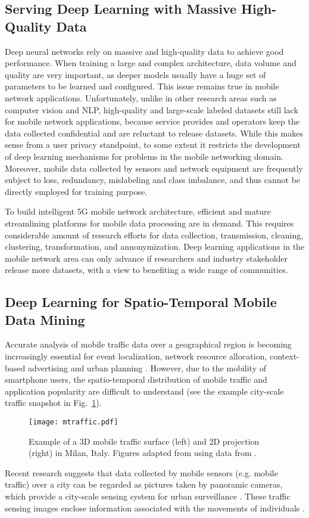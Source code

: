 \documentclass[journal,comsoc,letter]{IEEEtran}
\begin{document}
\subsection{Serving Deep Learning with Massive High-Quality Data}
Deep neural networks rely on massive and high-quality data to achieve good performance. When training a large and complex architecture, data volume and quality are very important, as deeper models usually have a huge set of parameters to be learned and configured. This issue remains true in mobile network applications. Unfortunately, unlike in other research areas such as computer vision and NLP, high-quality and large-scale labeled datasets still lack for mobile network applications, because service provides and operators keep the data collected confidential and are reluctant to release datasets. While this makes sense from a user privacy standpoint, to some extent it restricts the development of deep learning mechanisms for problems in the mobile networking domain. Moreover, mobile data collected by sensors and network equipment are frequently subject to loss, redundancy, mislabeling and class imbalance, and thus cannot be directly employed for training purpose.

To build intelligent 5G mobile network architecture, efficient and mature streamlining platforms for mobile data processing are in demand. This requires considerable amount of research efforts for data collection, transmission, cleaning, clustering, transformation, and annonymization. Deep learning applications in the mobile network area can only advance if researchers and industry stakeholder release more datasets, with a view to benefiting a wide range of communities.

\subsection{Deep Learning for Spatio-Temporal Mobile Data Mining}\label{sec:st-traffic}
Accurate analysis of mobile traffic data over a geographical region is becoming increasingly essential for event localization, network resource allocation, context-based advertising and urban planning \cite{furno2017joint}. However, due to the mobility of smartphone users, the spatio-temporal distribution of mobile traffic \cite{wang2015understanding} and application popularity \cite{marquez2017apps} are difficult to understand (see the example city-scale traffic snapshot in Fig.~\ref{fig:mtraffic}).
\begin{figure}[t]
\begin{center}
\texttt{[image: mtraffic.pdf]}
\end{center}
\caption{\label{fig:mtraffic} Example of a 3D mobile traffic surface (left) and 2D projection (right) in  Milan, Italy. Figures adapted from \cite{chaoyun2017zipnet} using data from \cite{barlacchi2015multi}.}
\end{figure}
Recent research suggests that data collected by mobile sensors (e.g. mobile traffic) over a city can be regarded as pictures taken by panoramic cameras, which provide a city-scale sensing system for urban surveillance \cite{liu2015urban}. These traffic sensing images enclose information associated with the movements of individuals \cite{naboulsi2016large}. 
\end{document}
